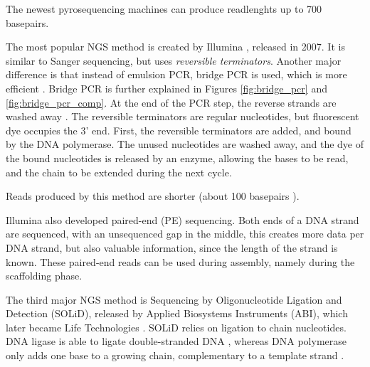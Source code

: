 \documentclass[../main/thesis.tex]{subfiles}
\begin{document}
The newest pyrosequencing machines can produce readlenghts up to 700 basepairs.



The most popular NGS method is created by Illumina \cite{most_popular_ngs}, released in 2007.
It is similar to Sanger sequencing, but uses \textit{reversible terminators}.
Another major difference is that instead of emulsion PCR, bridge PCR is used, which is more efficient \cite{ngs_sequencing_atdbio}.
Bridge PCR is further explained in Figures \ref{fig:bridge_pcr} and \ref{fig:bridge_pcr_comp}.
At the end of the PCR step, the reverse strands are washed away \cite{bridge_pcr_reverse}.
The reversible terminators are regular nucleotides, but fluorescent dye occupies the 3' end.
First, the reversible terminators are added, and bound by the DNA polymerase.
The unused nucleotides are washed away, and the dye of the bound nucleotides is released by an enzyme, allowing the bases to be read, and the chain to be extended during the next cycle.

Reads produced by this method are shorter (about 100 basepairs \cite{ngs_history}\cite{pyro_sequencing1}).


Illumina also developed paired-end (PE) sequencing.
Both ends of a DNA strand are sequenced, with an unsequenced gap in the middle, this creates more data per DNA strand, but also valuable information, since the length of the strand is known.
These paired-end reads can be used during assembly, namely during the scaffolding phase.



The third major NGS method is Sequencing by Oligonucleotide Ligation and Detection (SOLiD), released by Applied Biosystems Instruments (ABI), which later became Life Technologies \cite{history_sequencing}.
SOLiD relies on ligation to chain nucleotides.
DNA ligase is able to ligate double-stranded DNA \cite{ngs_sequencing_atdbio}, whereas DNA polymerase only adds one base to a growing chain, complementary to a template strand \cite{dna_replication}.
\end{document}
